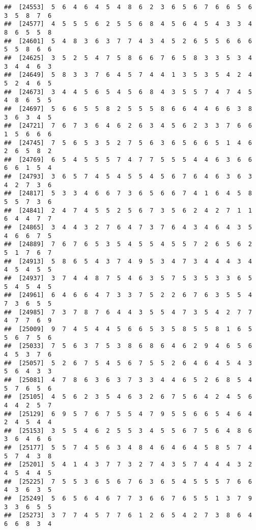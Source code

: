 \documentclass[
]{book}
\begin{document}
\begin{verbatim}
##  [24553]  5  6  4  6  4  5  4  8  6  2  3  6  5  6  7  6  6  5  6  3  5  8  7  6
##  [24577]  4  5  5  5  6  2  5  5  6  8  4  5  6  4  5  4  3  3  4  8  6  5  5  8
##  [24601]  5  4  8  3  6  3  7  7  4  3  4  5  2  6  5  5  6  6  6  5  5  8  6  6
##  [24625]  3  5  2  5  4  7  5  8  6  6  7  6  5  8  3  3  5  3  4  3  4  4  6  3
##  [24649]  5  8  3  3  7  6  4  5  7  4  4  1  3  5  3  5  4  2  4  5  2  4  6  5
##  [24673]  3  4  4  5  6  5  4  5  6  8  4  3  5  5  7  4  7  4  5  4  8  6  5  5
##  [24697]  5  6  6  5  5  8  2  5  5  5  8  6  6  4  4  6  6  3  8  3  6  3  4  5
##  [24721]  7  6  7  3  6  4  6  2  6  3  4  5  6  2  3  3  7  6  6  1  5  6  6  6
##  [24745]  7  5  6  5  3  5  2  7  5  6  3  6  5  6  6  5  1  4  6  2  6  5  8  2
##  [24769]  6  5  4  5  5  5  7  4  7  7  5  5  5  4  4  6  3  6  6  6  6  1  5  4
##  [24793]  3  6  5  7  4  5  4  5  5  4  5  6  7  6  4  6  3  6  3  4  2  7  3  6
##  [24817]  5  3  3  4  6  6  7  3  6  5  6  6  7  4  1  6  4  5  8  5  5  7  3  6
##  [24841]  2  4  7  4  5  5  2  5  6  7  3  5  6  2  4  2  7  1  1  6  4  4  7  7
##  [24865]  3  4  4  3  2  7  6  4  7  3  7  6  4  3  4  6  4  3  5  4  6  6  7  5
##  [24889]  7  6  7  6  5  3  5  4  5  5  4  5  5  7  2  6  5  6  2  5  1  7  6  7
##  [24913]  5  8  6  5  4  3  7  4  9  5  3  4  7  3  4  4  4  3  4  4  5  4  5  5
##  [24937]  3  7  4  4  8  7  5  4  6  3  5  7  5  3  5  3  3  6  5  5  4  5  4  5
##  [24961]  6  4  6  6  4  7  3  3  7  5  2  2  6  7  6  3  5  5  4  7  3  6  5  5
##  [24985]  7  3  7  8  7  6  4  4  3  5  5  4  7  3  5  4  2  7  7  4  7  7  6  9
##  [25009]  9  7  4  5  4  4  5  6  6  5  3  5  8  5  5  8  1  6  5  5  6  7  5  6
##  [25033]  7  5  6  3  7  5  3  8  6  8  6  4  6  2  9  4  6  5  6  4  5  3  7  6
##  [25057]  5  2  6  7  5  4  5  6  7  5  5  2  6  4  6  4  5  4  3  5  6  4  3  3
##  [25081]  4  7  8  6  3  6  3  7  3  3  4  4  6  5  2  6  8  5  4  5  7  6  5  6
##  [25105]  4  5  6  2  3  5  4  6  3  2  6  7  5  6  4  2  4  5  6  4  4  2  5  7
##  [25129]  6  9  5  7  6  7  5  5  4  7  9  5  5  6  6  5  4  6  4  2  4  5  4  4
##  [25153]  3  5  5  4  6  2  5  5  3  4  5  5  6  7  5  6  4  8  6  3  6  4  6  6
##  [25177]  5  5  7  4  5  6  3  4  8  4  6  4  6  4  5  8  5  7  4  5  7  4  3  8
##  [25201]  5  4  1  4  3  7  7  3  2  7  4  3  5  7  4  4  4  3  2  4  5  4  4  5
##  [25225]  7  5  5  3  6  5  6  7  6  3  6  5  4  5  5  5  7  6  6  4  3  6  3  5
##  [25249]  5  6  5  6  4  6  7  7  3  6  6  7  6  5  5  1  3  7  9  3  3  6  5  5
##  [25273]  3  7  7  4  5  7  7  6  1  2  6  5  4  2  7  3  8  6  4  6  6  8  3  4

\end{verbatim}
\end{document}

